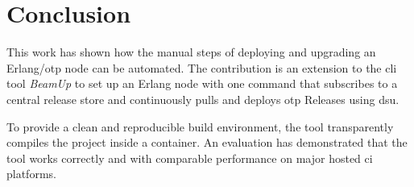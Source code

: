 \cleardoublepage
\section{Conclusion}

This work has shown how the manual steps of deploying and upgrading an Erlang/\acrshort{otp} node can be automated. The contribution is an extension to the \acrshort{cli} tool \emph{BeamUp} to set up an Erlang node with one command that subscribes to a central release store and continuously pulls and deploys \acrshort{otp} Releases using \acrshort{dsu}.




To provide a clean and reproducible build environment, the tool transparently compiles the project inside a container. An evaluation has demonstrated that the tool works correctly and with comparable performance on major hosted \acrshort{ci} platforms.
